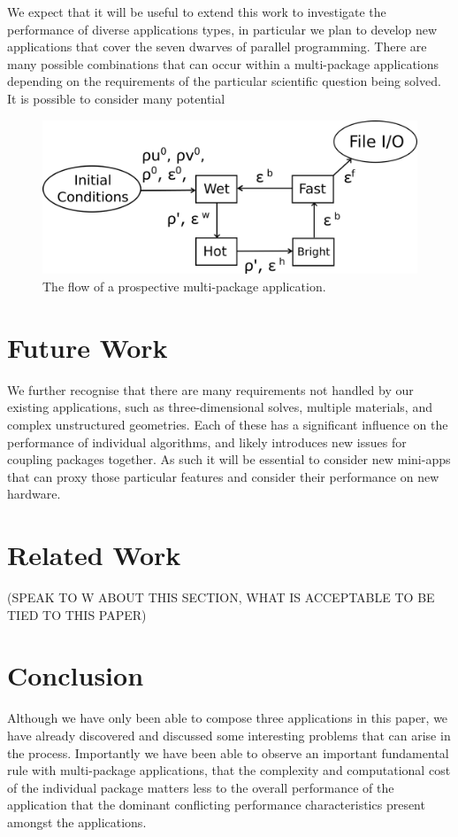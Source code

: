 \documentclass[runningheads,a4paper]{llncs}
\begin{document}
We expect that it will be useful to extend this work to investigate the performance of diverse applications types, in particular we plan to develop new applications that cover the seven dwarves of parallel programming. There are many possible combinations that can occur within a multi-package applications depending on the requirements of the particular scientific question being solved. It is possible to consider many potential 

\begin{figure}
\centering
\includegraphics[width=0.8\linewidth]{all-four-flow}
\caption{The flow of a prospective multi-package application.}
\label{fig:multi-package-flow}
\end{figure}

\section{Future Work}

We further recognise that there are many requirements not handled by our existing applications, such as three-dimensional solves, multiple materials, and complex unstructured geometries. Each of these has a significant influence on the performance of individual algorithms, and likely introduces new issues for coupling packages together. As such it will be essential to consider new mini-apps that can proxy those particular features and consider their performance on new hardware.

\section{Related Work}

(SPEAK TO W ABOUT THIS SECTION, WHAT IS ACCEPTABLE TO BE TIED TO THIS PAPER)

\section{Conclusion}

Although we have only been able to compose three applications in this paper, we have already discovered and discussed some interesting problems that can arise in the process. Importantly we have been able to observe an important fundamental rule with multi-package applications, that the complexity and computational cost of the individual package matters less to the overall performance of the application that the dominant conflicting performance characteristics present amongst the applications.



\end{document}
